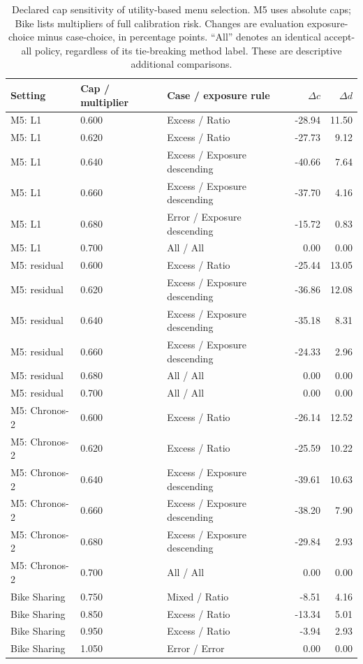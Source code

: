 \begin{table}[t]
\centering\scriptsize
\caption{Declared cap sensitivity of utility-based menu selection. M5 uses absolute caps; Bike lists multipliers of full calibration risk. Changes are evaluation exposure-choice minus case-choice, in percentage points. ``All'' denotes an identical accept-all policy, regardless of its tie-breaking method label. These are descriptive additional comparisons.}
\label{tab:choice-caps}
\begin{tabular}{lllr r}
\toprule
Setting & Cap / multiplier & Case / exposure rule & $\Delta c$ & $\Delta d$ \\
\midrule
M5: L1 & 0.600 & Excess / Ratio & -28.94 & 11.50 \\
M5: L1 & 0.620 & Excess / Ratio & -27.73 & 9.12 \\
M5: L1 & 0.640 & Excess / Exposure descending & -40.66 & 7.64 \\
M5: L1 & 0.660 & Excess / Exposure descending & -37.70 & 4.16 \\
M5: L1 & 0.680 & Error / Exposure descending & -15.72 & 0.83 \\
M5: L1 & 0.700 & All / All & 0.00 & 0.00 \\
M5: residual & 0.600 & Excess / Ratio & -25.44 & 13.05 \\
M5: residual & 0.620 & Excess / Exposure descending & -36.86 & 12.08 \\
M5: residual & 0.640 & Excess / Exposure descending & -35.18 & 8.31 \\
M5: residual & 0.660 & Excess / Exposure descending & -24.33 & 2.96 \\
M5: residual & 0.680 & All / All & 0.00 & 0.00 \\
M5: residual & 0.700 & All / All & 0.00 & 0.00 \\
M5: Chronos-2 & 0.600 & Excess / Ratio & -26.14 & 12.52 \\
M5: Chronos-2 & 0.620 & Excess / Ratio & -25.59 & 10.22 \\
M5: Chronos-2 & 0.640 & Excess / Exposure descending & -39.61 & 10.63 \\
M5: Chronos-2 & 0.660 & Excess / Exposure descending & -38.20 & 7.90 \\
M5: Chronos-2 & 0.680 & Excess / Exposure descending & -29.84 & 2.93 \\
M5: Chronos-2 & 0.700 & All / All & 0.00 & 0.00 \\
Bike Sharing & 0.750 & Mixed / Ratio & -8.51 & 4.16 \\
Bike Sharing & 0.850 & Excess / Ratio & -13.34 & 5.01 \\
Bike Sharing & 0.950 & Excess / Ratio & -3.94 & 2.93 \\
Bike Sharing & 1.050 & Error / Error & 0.00 & 0.00 \\
\bottomrule
\end{tabular}
\end{table}
